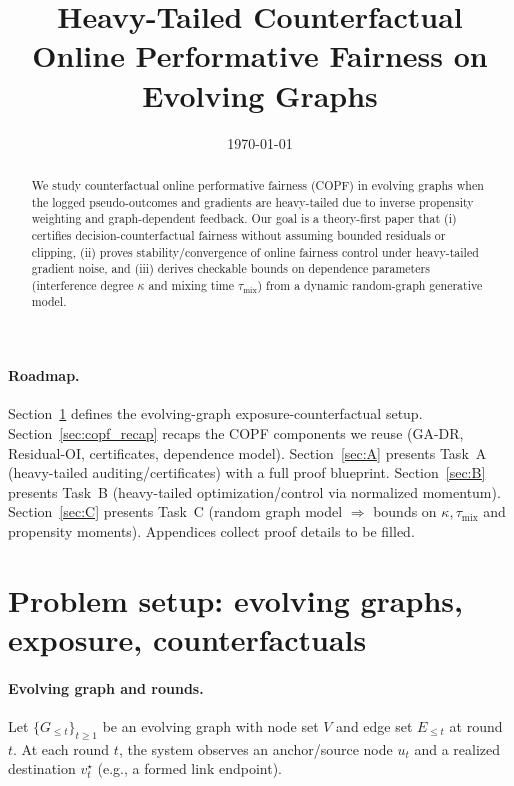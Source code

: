 \documentclass[11pt]{article}
\title{\vspace{-1.2em}Heavy-Tailed Counterfactual Online Performative Fairness on Evolving Graphs}
\date{\vspace{-0.6em}\today}
\newcommand{\1}{\mathbf{1}}
\theoremstyle{plain}
\theoremstyle{definition}
\theoremstyle{remark}
\begin{document}
\maketitle

\begin{abstract}
We study counterfactual online performative fairness (COPF) in evolving graphs when the logged
pseudo-outcomes and gradients are heavy-tailed due to inverse propensity weighting and graph-dependent feedback.
Our goal is a theory-first paper that (i) certifies decision-counterfactual fairness without assuming bounded residuals or clipping,
(ii) proves stability/convergence of online fairness control under heavy-tailed gradient noise, and
(iii) derives checkable bounds on dependence parameters (interference degree $\kappa$ and mixing time $\tau_{\mathrm{mix}}$)
from a dynamic random-graph generative model.
\end{abstract}

\paragraph{Roadmap.}
Section~\ref{sec:setup} defines the evolving-graph exposure-counterfactual setup.
Section~\ref{sec:copf_recap} recaps the COPF components we reuse (GA-DR, Residual-OI, certificates, dependence model).
Section~\ref{sec:A} presents Task~A (heavy-tailed auditing/certificates) with a full proof blueprint.
Section~\ref{sec:B} presents Task~B (heavy-tailed optimization/control via normalized momentum).
Section~\ref{sec:C} presents Task~C (random graph model $\Rightarrow$ bounds on $\kappa,\tau_{\mathrm{mix}}$ and propensity moments).
Appendices collect proof details to be filled.

\section{Problem setup: evolving graphs, exposure, counterfactuals}
\label{sec:setup}

\paragraph{Evolving graph and rounds.}
Let $\{G_{\le t}\}_{t\ge 1}$ be an evolving graph with node set $V$ and edge set $E_{\le t}$ at round $t$.
At each round $t$, the system observes an anchor/source node $u_t$ and a realized destination $v_t^\star$
(e.g., a formed link endpoint).
\end{document}
